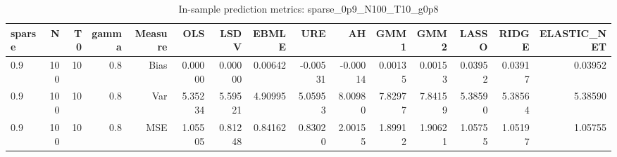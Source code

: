 \begin{table}[!htbp]\centering
\caption{In-sample prediction metrics: sparse_0p9_N100_T10_g0p8}
\label{tab:table2_sparse_0p9_N100_T10_g0p8}
\begin{tabular}{lrrrrrrrrrrrrrr}
\hline
sparse & N & T0 & gamma & Measure & OLS & LSDV & EBMLE & URE & AH & GMM1 & GMM2 & LASSO & RIDGE & ELASTIC_NET \\
\hline
0.9 & 100 & 10 & 0.8 & Bias & 0.00000 & 0.00000 & 0.00642 & -0.00531 & -0.00014 & 0.00135 & 0.00153 & 0.03952 & 0.03917 & 0.03952 \\
0.9 & 100 & 10 & 0.8 & Var & 5.35234 & 5.59521 & 4.90995 & 5.05953 & 8.00980 & 7.82977 & 7.84159 & 5.38590 & 5.38564 & 5.38590 \\
0.9 & 100 & 10 & 0.8 & MSE & 1.05505 & 0.81248 & 0.84162 & 0.83020 & 2.00155 & 1.89912 & 1.90621 & 1.05755 & 1.05197 & 1.05755 \\
\hline
\end{tabular}
\end{table}

